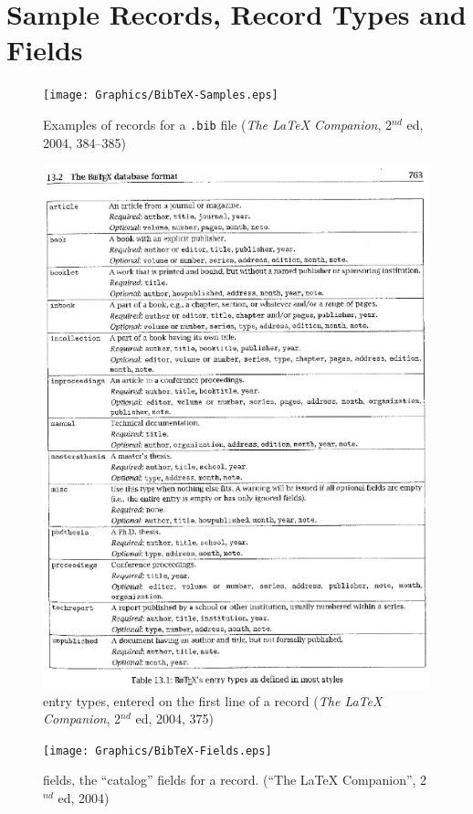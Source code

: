 \chapter{{\BibTeX} Sample Records, Record Types and Fields}\label{App:BibTeX-Records}




\begin{figure}[ht]
\label{BibSamples}
\begin{center}
\texttt{[image: Graphics/BibTeX-Samples.eps]}
\end{center}
\caption[Examples of {\BibTeX} records]{Examples of {\BibTeX} records for a \texttt{.bib} file ({\em The {LaTeX} Companion}, 2$^{nd}$ ed, 2004, 384--385)}  
\end{figure}

\newpage
\begin{figure}[ht]
\label{BibEntryTypes}
\begin{center}
\includegraphics[scale=0.7]{Graphics/BibTeX-Entry-Types.eps}
\end{center}
\caption[{\BibTeX} entry types]{{\BibTeX} entry types, entered on the first line of a {\BibTeX} record ({\em The {LaTeX} Companion}, 2$^{nd}$ ed, 2004, 375)}
\end{figure}

\newpage

\begin{figure}[ht]
\label{BobFields}
\begin{center}
\texttt{[image: Graphics/BibTeX-Fields.eps]}
\end{center}
\caption[{\BibTeX} fields]{{\BibTeX} fields, the ``catalog'' fields for a {\BibTeX} record.  (``The {LaTeX} Companion'', 2$^{nd}$ ed, 2004)} 
\end{figure}


\endinput
